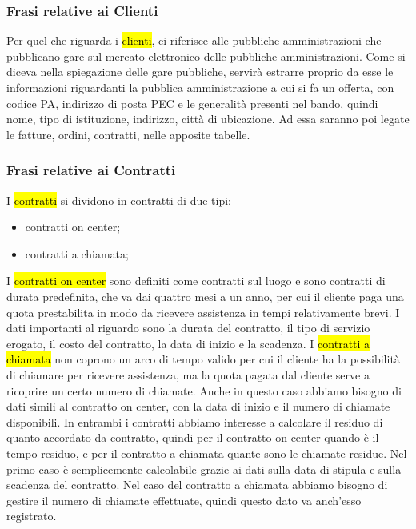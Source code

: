 \subsubsection{Frasi relative ai Clienti}
Per quel che riguarda i \hl{clienti}, ci riferisce alle pubbliche amministrazioni che pubblicano gare sul mercato elettronico delle pubbliche amministrazioni. Come si diceva nella spiegazione delle gare pubbliche, servirà estrarre proprio da esse le informazioni riguardanti la pubblica amministrazione a cui si fa un offerta, con codice PA, indirizzo di posta PEC e le generalità presenti nel bando, quindi nome, tipo di istituzione, indirizzo, città di ubicazione.\newline
Ad essa saranno poi legate le fatture, ordini, contratti, nelle apposite tabelle.  

\subsubsection{Frasi relative ai Contratti}
I \hl{contratti} si dividono in contratti di due tipi: 
\begin{itemize}
\item	contratti on center;
\item	contratti a chiamata;
\end{itemize}
I \hl{contratti on center} sono definiti come contratti sul luogo e sono contratti di durata predefinita, che va dai quattro mesi a un anno, per cui il cliente paga una quota prestabilita in modo da ricevere assistenza in tempi relativamente brevi.\newline
I dati importanti al riguardo sono la durata del contratto, il tipo di servizio erogato, il costo del contratto, la data di inizio e la scadenza.
I \hl{contratti a chiamata} non coprono un arco di tempo valido per cui il cliente ha la possibilità di chiamare per ricevere assistenza, ma la quota pagata dal cliente serve a ricoprire un certo numero di chiamate. Anche in questo caso abbiamo bisogno di dati simili al contratto on center, con la data di inizio e il numero di chiamate disponibili.\newline
In entrambi i contratti abbiamo interesse a calcolare il residuo di quanto accordato da contratto, quindi per il contratto on center quando è il tempo residuo, e per il contratto a chiamata quante sono le chiamate residue. Nel primo caso è semplicemente calcolabile grazie ai dati sulla data di stipula e sulla scadenza del contratto. Nel caso del contratto a chiamata abbiamo bisogno di gestire il numero di chiamate effettuate, quindi questo dato va anch'esso registrato.

